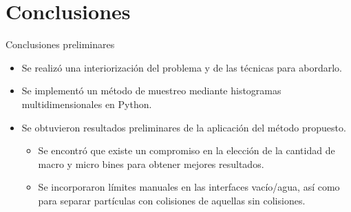 \documentclass[aspectratio=169,english]{beamer}
\begin{document}
    


\section{Conclusiones}
\begin{frame}{Conclusiones preliminares}
    \begin{itemize}
        \item Se realizó una interiorización del problema y de las técnicas para abordarlo.\\
        \item Se implementó un método de muestreo mediante histogramas multidimensionales en Python.\\
        \item Se obtuvieron resultados preliminares de la aplicación del método propuesto.\\
            \begin{itemize}
            \item Se encontró que existe un compromiso en la elección de la cantidad de macro y micro bines para obtener mejores resultados.\\
            \item Se incorporaron límites manuales en las interfaces vacío/agua, así como para separar partículas con colisiones de aquellas sin colisiones.\\
            \end{itemize}
    
    \end{itemize}

\end{frame}
\end{document}
